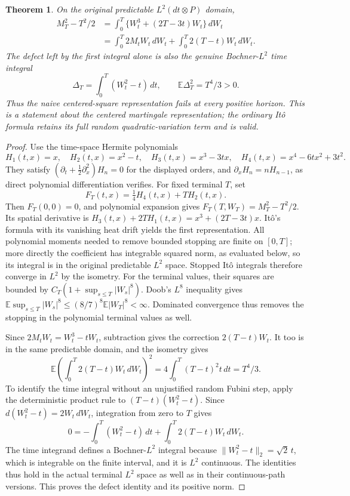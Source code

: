 \documentclass[11pt]{article}
\newtheorem{theorem}{Theorem}[section]
\newcommand{\E}{\mathbb E}
\begin{document}
\begin{theorem}\label{thm:martingalesquare}
On the original predictable $L^2(dt\otimes P)$ domain,
\begin{align*}
 M_T^2-T^2/2
 &=\int_0^T\{W_t^3+(2T-3t)W_t\}\,dW_t\\
 &=\int_0^T2M_tW_t\,dW_t+
                    \int_0^T2(T-t)W_t\,dW_t.
\end{align*}
The defect left by the first integral alone is also the genuine
Bochner-$L^2$ time integral
\[
 \Delta_T=\int_0^T(W_t^2-t)\,dt,
 \qquad \E\Delta_T^2=T^4/3>0.
\]
Thus the naive centered-square representation fails at every
positive horizon. This is a statement about the centered martingale
representation; the ordinary It\^o formula retains its full random
quadratic-variation term and is valid.
\end{theorem}
\begin{proof}
Use the time-space Hermite polynomials
\[
 H_1(t,x)=x,\quad H_2(t,x)=x^2-t,\quad
 H_3(t,x)=x^3-3tx,\quad
 H_4(t,x)=x^4-6tx^2+3t^2.
\]
They satisfy $(\partial_t+\frac12\partial_x^2)H_n=0$ for the
displayed orders, and $\partial_xH_n=nH_{n-1}$, as direct polynomial
differentiation verifies. For fixed terminal $T$, set
\[
 F_T(t,x)=\tfrac14H_4(t,x)+T H_2(t,x).
\]
Then $F_T(0,0)=0$, and polynomial expansion gives
$F_T(T,W_T)=M_T^2-T^2/2$.
Its spatial derivative is
$H_3(t,x)+2T H_1(t,x)=x^3+(2T-3t)x$.
It\^o's formula with its vanishing heat drift yields the first
representation. All polynomial moments needed to remove bounded
stopping are finite on $[0,T]$; more directly the coefficient has
integrable squared norm, as evaluated below, so its integral is in
the original predictable $L^2$ space. Stopped It\^o integrals
therefore converge in $L^2$ by the isometry. For the terminal values,
their squares are bounded by $C_T(1+\sup_{s\le T}|W_s|^8)$.
Doob's $L^8$ inequality gives
$\E\sup_{s\le T}|W_s|^8\le(8/7)^8\E|W_T|^8<\infty$.
Dominated convergence thus removes the stopping in the polynomial
terminal values as well.

Since $2M_tW_t=W_t^3-tW_t$, subtraction gives the correction
$2(T-t)W_t$. It too is in the same predictable domain, and the
isometry gives
\[
 \E\left(\int_0^T2(T-t)W_t\,dW_t\right)^2
       =4\int_0^T(T-t)^2t\,dt=T^4/3.
\]
To identify the time integral without an unjustified random Fubini
step, apply the deterministic product rule to
$(T-t)(W_t^2-t)$. Since $d(W_t^2-t)=2W_t\,dW_t$, integration from
zero to $T$ gives
\[
 0=-\int_0^T(W_t^2-t)\,dt+
                       \int_0^T2(T-t)W_t\,dW_t.
\]
The time integrand defines a Bochner-$L^2$ integral because
$\|W_t^2-t\|_2=\sqrt2\,t$, which is integrable on the finite
interval, and it is $L^2$ continuous. The identities thus hold in
the actual terminal $L^2$ space as well as in their continuous-path
versions. This proves the defect identity and its positive norm.
\end{proof}
\end{document}
